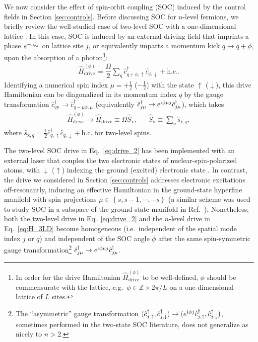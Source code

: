 \documentclass[aps,pra,nofootinbib,twocolumn,superscriptaddress]{revtex4-2}
\renewcommand{\t}{\text} %
\newcommand{\f}[2]{\dfrac{#1}{#2}} %
\renewcommand{\set}[1]{\left\{#1\right\}} %
\renewcommand{\i}{\mathrm{i}\mkern1mu} %
\newcommand{\1}{\mathds{1}}
\renewcommand{\c}{\hat{c}}
\newcommand{\s}{\hat{s}}
\renewcommand{\H}{\hat{H}}
\renewcommand{\S}{\hat{S}}
\newcommand{\up}{\uparrow}
\newcommand{\dn}{\downarrow}
\newcommand{\x}{\text{x}}
\newcommand{\ZZ}{\mathbb{Z}}
\begin{document}
We now consider the effect of spin-orbit coupling (SOC) induced by the control fields in Section \ref{sec:controls}.
Before discussing SOC for $n$-level fermions, we briefly review the well-studied case of two-level SOC with a one-dimensional lattice \cite{wall2016synthetic, kolkowitz2016spinorbitcoupled, bromley2018dynamics, he2019engineering}.
In this case, SOC is induced by an external driving field that imprints a phase $e^{-\i\phi j}$ on lattice site $j$, or equivalently imparts a momentum kick $q\to q+\phi$, upon the absorption of a photon\footnote{
In order for the drive Hamiltonian $\H_{\t{drive}}^{(\phi)}$ to be well-defined, $\phi$ should be commensurate with the lattice, e.g.~$\phi\in\ZZ\times2\pi/L$ on a one-dimensional lattice of $L$ sites.
}:
\begin{align}
  \H_{\t{drive}}^{(\phi)}
  = \f{\Omega}{2} \sum_q \c_{q+\phi,\up}^\dag \c_{q,\dn} + \t{h.c.}.
  \label{eq:drive_2}
\end{align}
Identifying a numerical spin index $\mu=+\frac12$ ($-\frac12$) with the state $\up$ ($\dn$), this drive Hamiltonian can be diagonalized in its momentum index $q$ by the gauge transformation $\c_{q\mu}^\dag\to \c_{q-\mu\phi,\mu}^\dag$ (equivalently $\c_{j\mu}^\dag\to e^{\i\phi\mu j} \c_{j\mu}^\dag$), which takes
\begin{align}
  \H_{\t{drive}}^{(\phi)} \to \H_{\t{drive}} \equiv \Omega \S_\x,
  &&
  \S_\x \equiv \sum_q \s_{\x,q},
  \label{eq:drive_trans}
\end{align}
where $\s_{\x,q}=\frac12 \c_{q,\up}^\dag \c_{q,\dn} + \t{h.c.}$ for two-level spins.

The two-level SOC drive in Eq.~\eqref{eq:drive_2} has been implemented with an external laser that couples the two electronic states of nuclear-spin-polarized atoms, with $\dn$ ($\up$) indexing the ground (excited) electronic state \cite{wall2016synthetic, livi2016synthetic, kolkowitz2016spinorbitcoupled, bromley2018dynamics, he2019engineering}.
In contrast, the drive we considered in Section \ref{sec:controls} addresses electronic excitations off-resonantly, inducing an effective Hamiltonian in the ground-state hyperfine manifold with spin projections $\mu\in\set{s,s-1,\cdots,-s}$ (a similar scheme was used to study SOC in a subspace of the ground-state manifold in Ref.~\cite{mancini2015observation}).
Nonetheless, both the two-level drive in Eq.~\eqref{eq:drive_2} and the $n$-level drive in Eq.~\eqref{eq:H_3LD} become homogeneous (i.e.~independent of the spatial mode index $j$ or $q$) and independent of the SOC angle $\phi$ after the same spin-symmetric gauge transformation\footnote{
The ``asymmetric'' gauge transformation $(\c_{j,\up}^\dag,\c_{j,\dn}^\dag)\to(e^{\i\phi j} \c_{j,\up}^\dag,\c_{j,\dn}^\dag)$, sometimes performed in the two-state SOC literature, does not generalize as nicely to $n>2$.
} $\c_{j\mu}^\dag\to e^{\i\phi\mu j} \c_{j\mu}^\dag$.
\end{document}
